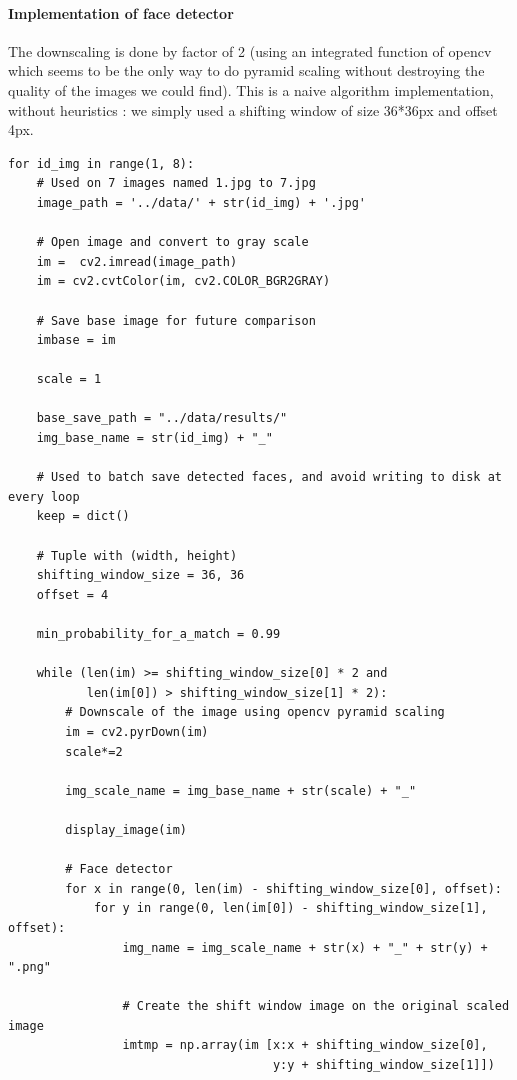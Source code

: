 \documentclass[french]{article}
\begin{document}
\paragraph{Implementation of face detector} The downscaling is done by factor of 2 (using an integrated function of opencv which seems to be the only way to do pyramid scaling without destroying the quality of the images we could find). This is a naive algorithm implementation, without heuristics : we simply used a shifting window of size 36*36px and offset 4px.

\begin{verbatim}
for id_img in range(1, 8):
    # Used on 7 images named 1.jpg to 7.jpg
    image_path = '../data/' + str(id_img) + '.jpg'
    
    # Open image and convert to gray scale
    im =  cv2.imread(image_path)
    im = cv2.cvtColor(im, cv2.COLOR_BGR2GRAY)
    
    # Save base image for future comparison
    imbase = im
    
    scale = 1
    
    base_save_path = "../data/results/"
    img_base_name = str(id_img) + "_"
    
    # Used to batch save detected faces, and avoid writing to disk at every loop
    keep = dict()
    
    # Tuple with (width, height)
    shifting_window_size = 36, 36
    offset = 4
    
    min_probability_for_a_match = 0.99
    
    while (len(im) >= shifting_window_size[0] * 2 and 
           len(im[0]) > shifting_window_size[1] * 2):
        # Downscale of the image using opencv pyramid scaling
        im = cv2.pyrDown(im)
        scale*=2
        
        img_scale_name = img_base_name + str(scale) + "_"
        
        display_image(im)
        
        # Face detector
        for x in range(0, len(im) - shifting_window_size[0], offset):
            for y in range(0, len(im[0]) - shifting_window_size[1], offset):
                img_name = img_scale_name + str(x) + "_" + str(y) + ".png"
                
                # Create the shift window image on the original scaled image 
                imtmp = np.array(im [x:x + shifting_window_size[0],
                                     y:y + shifting_window_size[1]])
                

\end{verbatim}
\end{document}
